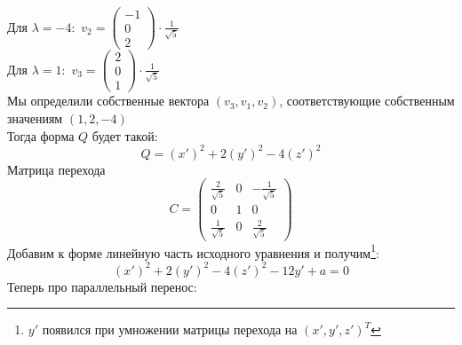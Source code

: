 \documentclass[a4paper]{article}
\begin{document}
$\boxed{\text{Для }\lambda=-4:}$ $v_2=\begin{pmatrix}
    -1\\
    0\\
    2
\end{pmatrix}\cdot\displaystyle\frac{1}{\sqrt{5}}$\\[2mm]
$\boxed{\text{Для }\lambda=1:}$ $v_3=\begin{pmatrix}
    2\\
    0\\
    1
\end{pmatrix}\cdot\displaystyle\frac{1}{\sqrt{5}}$\\[2mm]
Мы определили собственные вектора $(v_3, v_1, v_2)$, соответствующие собственным значениям $(1, 2, -4)$\\[2mm]
Тогда форма $Q$ будет такой:
$$Q=(x')^2+2(y')^2-4(z')^2$$
Матрица перехода $$C=\begin{pmatrix}
    \frac{2}{\sqrt{5}}&0&-\frac{1}{\sqrt{5}}\\[1mm]
    0&1&0\\[1mm]
    \frac{1}{\sqrt{5}}&0&\frac{2}{\sqrt{5}}
\end{pmatrix}$$
Добавим к форме линейную часть исходного уравнения и получим\footnote{$y'$ появился при умножении матрицы перехода на $(x',y',z')^T$}:
$$(x')^2+2(y')^2-4(z')^2-12y'+a=0$$
Теперь про параллельный перенос:
\end{document}
